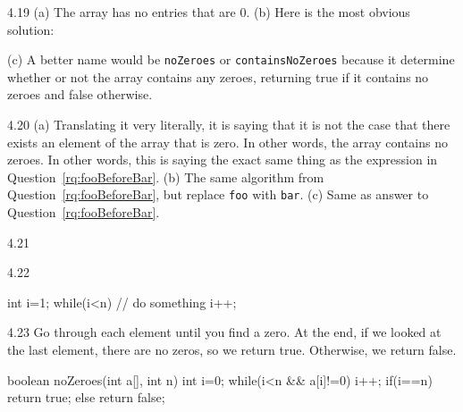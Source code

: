 \begin{RequAnswer}{4.19}
(a) The array has no entries that are 0.
(b) Here is the most obvious solution:
\begin{code}
boolean foo(int []A, int n)
    for (int i = 0; i < n; i++) {
        if(a[i] == 0) {
            return false;
        }
    }
    return true;
}
\end{code}
(c) A better name would be \verb+noZeroes+ or \verb+containsNoZeroes+
because it determine whether or not the array contains any zeroes, returning true if it contains no zeroes and
false otherwise.
\end{RequAnswer}
\begin{RequAnswer}{4.20}
(a) Translating it very literally, it is saying that it is not the case that there exists an element of the array that is zero.
In other words, the array contains no zeroes. In other words, this is saying the exact same thing as the expression
in Question~\ref{rq:fooBeforeBar}.
(b) The same algorithm from Question~\ref{rq:fooBeforeBar}, but replace \verb+foo+ with \verb+bar+.
(c) Same as answer to Question~\ref{rq:fooBeforeBar}.
\end{RequAnswer}
\begin{RequAnswer}{4.21}
\end{RequAnswer}
\begin{RequAnswer}{4.22}
\begin{code}
int i=1;
while(i<n) {
    // do something
    i++;
}
\end{code}
\end{RequAnswer}
\begin{RequAnswer}{4.23}
Go through each element until you find a zero.
At the end, if we looked at the last element, there are
no zeros, so we return true. Otherwise, we return false.
\begin{code}
boolean noZeroes(int a[], int n) {
    int i=0;
    while(i<n && a[i]!=0) {
        i++;
    }
    if(i==n) {
        return true;
    } else {
        return false;
    }
}
\end{code}
\end{RequAnswer}
